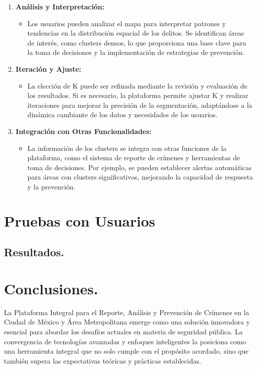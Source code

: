 \documentclass{article}
\begin{document}
\begin{enumerate}[label= \textbf{\arabic*.}, font=\bfseries]
    \item \textbf{Análisis y Interpretación:}
       \begin{itemize}
           \item Los usuarios pueden analizar el mapa para interpretar patrones y tendencias en la distribución espacial de los delitos. Se identifican áreas de interés, como clusters densos, lo que proporciona una base clave para la toma de decisiones y la implementación de estrategias de prevención.
       \end{itemize}

    \item \textbf{Iteración y Ajuste:}
       \begin{itemize}
           \item La elección de K puede ser refinada mediante la revisión y evaluación de los resultados. Si es necesario, la plataforma permite ajustar K y realizar iteraciones para mejorar la precisión de la segmentación, adaptándose a la dinámica cambiante de los datos y necesidades de los usuarios.
       \end{itemize}

    \item \textbf{Integración con Otras Funcionalidades:}
       \begin{itemize}
           \item La información de los clusters se integra con otras funciones de la plataforma, como el sistema de reporte de crímenes y herramientas de toma de decisiones. Por ejemplo, se pueden establecer alertas automáticas para áreas con clusters significativos, mejorando la capacidad de respuesta y la prevención.
       \end{itemize}

    \end{enumerate}

\section{Pruebas con Usuarios}
\subsection{Resultados.}

\section{Conclusiones.}

La Plataforma Integral para el Reporte, Análisis y Prevención de Crímenes en la Ciudad de México y Área Metropolitana emerge como una solución innovadora y esencial para abordar los desafíos actuales en materia de seguridad pública. La convergencia de tecnologías avanzadas y enfoques inteligentes la posiciona como una herramienta integral que no solo cumple con el propósito acordado, sino que también supera las expectativas teóricas y prácticas establecidas.
\end{document}
